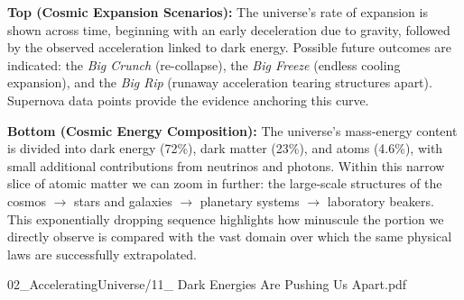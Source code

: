 \begin{SideNotePage}{
  \textbf{Top (Cosmic Expansion Scenarios):} The universe’s rate of expansion is shown across time, beginning with an early deceleration due to gravity, followed by the observed acceleration linked to dark energy. Possible future outcomes are indicated: the \emph{Big Crunch} (re-collapse), the \emph{Big Freeze} (endless cooling expansion), and the \emph{Big Rip} (runaway acceleration tearing structures apart). Supernova data points provide the evidence anchoring this curve. \par
  \textbf{Bottom (Cosmic Energy Composition):} The universe’s mass-energy content is divided into dark energy (72\%), dark matter (23\%), and atoms (4.6\%), with small additional contributions from neutrinos and photons. Within this narrow slice of atomic matter we can zoom in further: the large-scale structures of the cosmos \(\to\) stars and galaxies \(\to\) planetary systems \(\to\) laboratory beakers. This exponentially dropping sequence highlights how minuscule the portion we directly observe is compared with the vast domain over which the same physical laws are successfully extrapolated. \par

}{02_AcceleratingUniverse/11_ Dark Energies Are Pushing Us Apart.pdf}
\end{SideNotePage}
